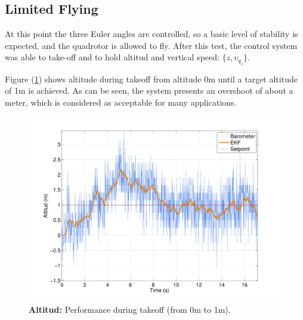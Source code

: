\documentclass[conference]{IEEEtran}
\newcommand{\refp}[1]{(\ref{#1})}
\begin{document}
\subsection{Limited Flying}
\label{sec:results-system-response}
At this point the three Euler angles are controlled, so a basic level of stability is expected, and the quadrotor is allowed to fly. After this test, the control system was able to take-off and to hold altitud and vertical speed: $\{z,v_{q_z}\}$.






Figure \refp{fig:altura.pdf} shows altitude during takeoff from altitude 0m until a target altitude of 1m is achieved. As can be seen, the system presents an overshoot of about a meter, which is considered as acceptable for many applications. 


\begin{figure}[h!]
	\centering
	\includegraphics[width=.7\columnwidth]{./pics_paper/altura.pdf}
	\caption{\textbf{Altitud:} Performance during takeoff (from 0m to 1m).}
	\label{fig:altura.pdf}
\end{figure}
\end{document}
